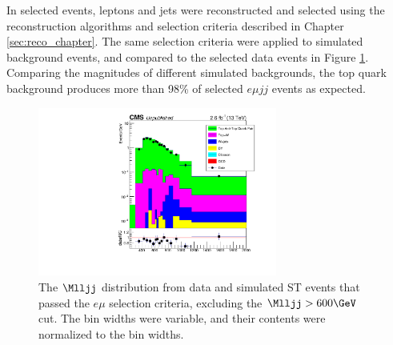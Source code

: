 In selected events, leptons and jets were reconstructed and selected using the reconstruction algorithms and selection 
criteria described in Chapter \ref{sec:reco_chapter}.  The same selection criteria were applied to simulated background events, and compared 
to the selected data events in Figure \ref{fig:dataAndSimsInEMuChannel}.  Comparing the magnitudes of different simulated backgrounds, the 
top quark background produces more than 98\% of selected $e\mu jj$ events as expected.

\begin{figure}[h]
	\centering
	\includegraphics[width=0.7\textwidth]{figures/Mlljj_eMuChannel_log.pdf}
	\caption{The $\Mlljj$ distribution from data and simulated ST events that passed the $e\mu$ selection criteria, excluding 
	the $\Mlljj > 600 \GeV$ cut.  The bin widths were variable, and their contents were normalized to the bin widths.}
	\label{fig:dataAndSimsInEMuChannel}
\end{figure}

